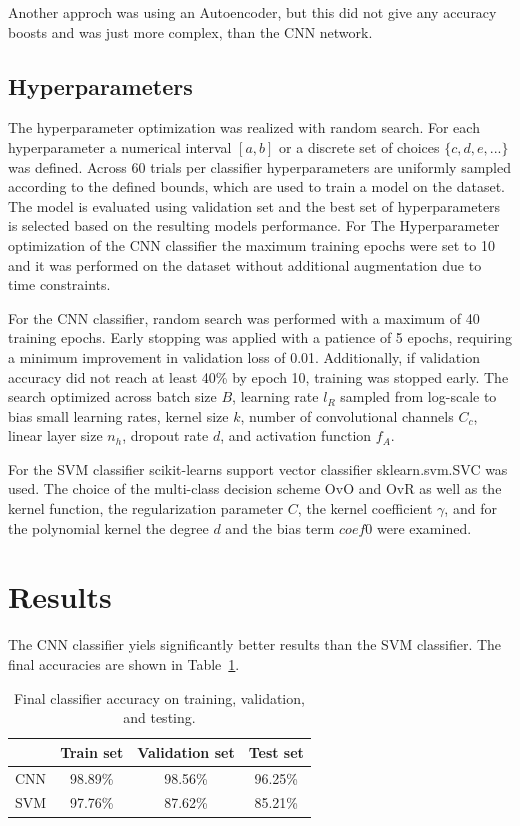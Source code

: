 \documentclass[a4, 10 pt, conference]{ieeeconf}  %
\begin{document}
Another approch was using an Autoencoder, but this did not give any accuracy boosts and was just more complex, than the CNN network.

\subsection{Hyperparameters}
\label{subsec:hyperparameters}

The hyperparameter optimization was realized with random search. For each
hyperparameter a numerical interval $[a, b]$ or a discrete set of choices $\{c,d,e,...\}$
was defined. Across 60 trials per classifier hyperparameters are uniformly sampled according
to the defined bounds, which are used to train a model on the dataset. The model is
evaluated using validation set and the best set of hyperparameters is selected
based on the resulting models performance.
For The Hyperparameter optimization of the CNN classifier the maximum training epochs
were set to 10 and it was performed on the dataset without additional augmentation due
to time constraints.

For the CNN classifier, random search was performed with a maximum of 40 training epochs.
Early stopping was applied with a patience of 5 epochs, requiring a minimum improvement in
validation loss of 0.01. Additionally, if validation accuracy did not reach at least 40\% by
epoch 10, training was stopped early. The search optimized across batch size $B$, learning rate
$l_R$ sampled from log-scale to bias small learning rates, kernel size $k$, number of convolutional channels $C_c$, linear layer size $n_h$, dropout
rate $d$, and activation function $f_A$.

For the SVM classifier scikit-learns support vector classifier sklearn.svm.SVC was used.
The choice of the multi-class decision scheme OvO and OvR as well as the kernel function,
the regularization parameter $C$, the kernel coefficient $\gamma$, and for the
polynomial kernel the degree $d$ and the bias term $coef0$ were examined.

\section{Results}
\label{sec:results}

The CNN classifier yiels significantly better results than the SVM classifier.
The final accuracies are shown in Table~\ref{tab:classifier_accuracy}.


\begin{table}[H]
  \centering
  \begin{tabular}{|l|c|c|c|}
    \hline
        & Train set & Validation set & Test set \\
    \hline
    CNN & 98.89\%   & 98.56\%        & 96.25\%  \\
    SVM & 97.76\%   & 87.62\%        & 85.21\%  \\
    \hline
  \end{tabular}
  \caption{Final classifier accuracy on training, validation, and testing.}
  \label{tab:classifier_accuracy}
\end{table}
\end{document}

